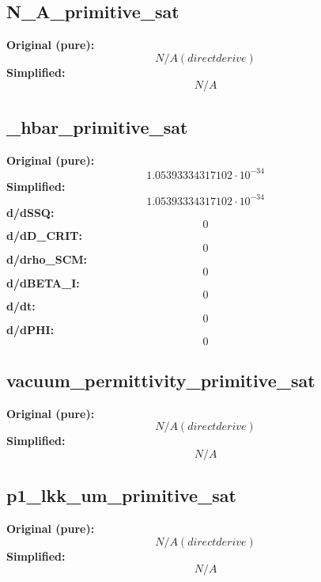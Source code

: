\subsection{N_A_primitive_sat}
\textbf{Original (pure):}
\begin{equation}
N/A (direct derive)
\end{equation}
\textbf{Simplified:}
\begin{equation}
N/A
\end{equation}

\subsection{_hbar_primitive_sat}
\textbf{Original (pure):}
\begin{equation}
1.05393334317102 \cdot 10^{-34}
\end{equation}
\textbf{Simplified:}
\begin{equation}
1.05393334317102 \cdot 10^{-34}
\end{equation}
\textbf{d/dSSQ:}
\begin{equation}
0
\end{equation}
\textbf{d/dD_CRIT:}
\begin{equation}
0
\end{equation}
\textbf{d/drho_SCM:}
\begin{equation}
0
\end{equation}
\textbf{d/dBETA_I:}
\begin{equation}
0
\end{equation}
\textbf{d/dt:}
\begin{equation}
0
\end{equation}
\textbf{d/dPHI:}
\begin{equation}
0
\end{equation}

\subsection{vacuum_permittivity_primitive_sat}
\textbf{Original (pure):}
\begin{equation}
N/A (direct derive)
\end{equation}
\textbf{Simplified:}
\begin{equation}
N/A
\end{equation}

\subsection{p1_lkk_um_primitive_sat}
\textbf{Original (pure):}
\begin{equation}
N/A (direct derive)
\end{equation}
\textbf{Simplified:}
\begin{equation}
N/A
\end{equation}

